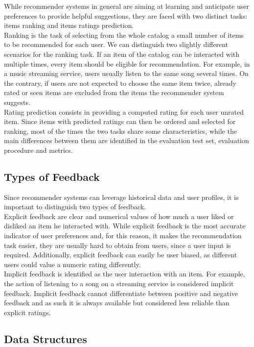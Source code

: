 While recommender systems in general are aiming at learning and anticipate user preferences to provide helpful suggestions, they are faced with two distinct tasks: items ranking and items ratings prediction.\\
Ranking is the task of selecting from the whole catalog a small number of items to be recommended for each user. We can distinguish two slightly different scenarios for the ranking task. If an item of the catalog can be interacted with multiple times, every item should be eligible for recommendation. For example, in a music streaming service, users usually listen to the same song several times. On the contrary, if users are not expected to choose the same item twice, already rated or seen items are excluded from the items the recommender system suggests.\\
Rating prediction consists in providing a computed rating for each user unrated item. Since items with predicted ratings can then be ordered and selected for ranking, most of the times the two tasks share some characteristics, while the main differences between them are identified in the evaluation test set, evaluation procedure and metrics.


\subsection{Types of Feedback}

Since recommender systems can leverage historical data and user profiles, it is important to distinguish two types of feedback.\\
Explicit feedback are clear and numerical values of how much a user liked or disliked an item he interacted with. While explicit feedback is the most accurate indicator of user preferences and, for this reason, it makes the recommendation task easier, they are usually hard to obtain from users, since a user input is required. Additionally, explicit feedback can easily be user biased, as different users could value a numeric rating differently.\\
Implicit feedback is identified as the user interaction with an item. For example, the action of listening to a song on a streaming service is considered implicit feedback.
Implicit feedback cannot differentiate between positive and negative feedback and as such it is always available but considered less reliable than explicit ratings.


\subsection{Data Structures}

